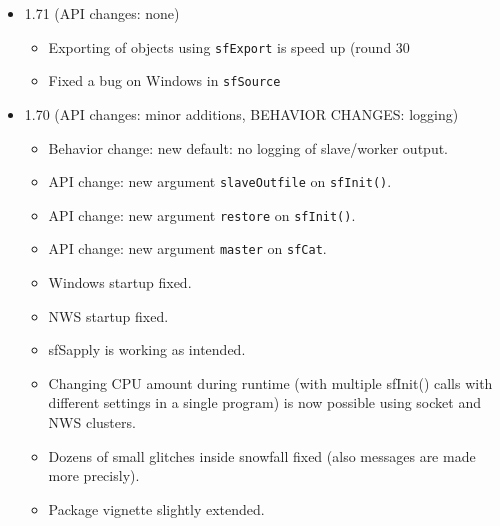\documentclass[10pt,oneside]{article}
\begin{document}
\begin{itemize}
\item 1.71 (API changes: none)
      \begin{itemize}
      \item Exporting of objects using \texttt{sfExport} is speed up (round 30%
      \item Fixed a bug on Windows in \texttt{sfSource}
      \end{itemize}
\item 1.70 (API changes: minor additions, BEHAVIOR CHANGES: logging)
      \begin{itemize}
      \item Behavior change: new default: no logging of slave/worker output.
      \item API change: new argument \texttt{slaveOutfile} on \texttt{sfInit()}.
      \item API change: new argument \texttt{restore} on \texttt{sfInit()}.
      \item API change: new argument \texttt{master} on \texttt{sfCat}.
      \item Windows startup fixed.
      \item NWS startup fixed.
      \item sfSapply is working as intended.
      \item Changing CPU amount during runtime (with multiple sfInit() calls with different
            settings in a single program) is now possible using socket and NWS clusters.
      \item Dozens of small glitches inside snowfall fixed (also messages are made
            more precisly).
      \item Package vignette slightly extended.
      \end{itemize}
\end{itemize}



\end{document}
